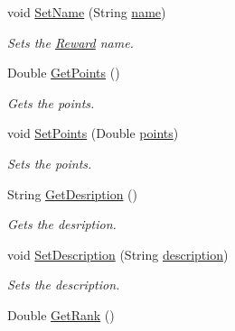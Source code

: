 \begin{DoxyCompactItemize}
void \hyperlink{classcom_1_1shephertz_1_1app42_1_1paas_1_1sdk_1_1csharp_1_1reward_1_1_reward_afd1f0f05bcd35103daa0ec9a3c651f12}{Set\+Name} (String \hyperlink{classcom_1_1shephertz_1_1app42_1_1paas_1_1sdk_1_1csharp_1_1reward_1_1_reward_a0e092b67d4fd4e7c458733cc1b1e38d1}{name})
\begin{DoxyCompactList}\small\item\em Sets the \hyperlink{classcom_1_1shephertz_1_1app42_1_1paas_1_1sdk_1_1csharp_1_1reward_1_1_reward}{Reward} name. \end{DoxyCompactList}\item 
Double \hyperlink{classcom_1_1shephertz_1_1app42_1_1paas_1_1sdk_1_1csharp_1_1reward_1_1_reward_afd3616cff1e4b019a366da552c483e55}{Get\+Points} ()
\begin{DoxyCompactList}\small\item\em Gets the points. \end{DoxyCompactList}\item 
void \hyperlink{classcom_1_1shephertz_1_1app42_1_1paas_1_1sdk_1_1csharp_1_1reward_1_1_reward_aba279b2d02474a5114eff2f2819dd30e}{Set\+Points} (Double \hyperlink{classcom_1_1shephertz_1_1app42_1_1paas_1_1sdk_1_1csharp_1_1reward_1_1_reward_ac5dc67f0962a577b371e98f76b3ea34b}{points})
\begin{DoxyCompactList}\small\item\em Sets the points. \end{DoxyCompactList}\item 
String \hyperlink{classcom_1_1shephertz_1_1app42_1_1paas_1_1sdk_1_1csharp_1_1reward_1_1_reward_a249b1666c0b96d8fe1ccb50d5cd7fdfd}{Get\+Desription} ()
\begin{DoxyCompactList}\small\item\em Gets the desription. \end{DoxyCompactList}\item 
void \hyperlink{classcom_1_1shephertz_1_1app42_1_1paas_1_1sdk_1_1csharp_1_1reward_1_1_reward_ae1ac38c9ea2b97abf56e840a6a68c61e}{Set\+Description} (String \hyperlink{classcom_1_1shephertz_1_1app42_1_1paas_1_1sdk_1_1csharp_1_1reward_1_1_reward_af47d9b6832d16cea33fbb19207ad0c5a}{description})
\begin{DoxyCompactList}\small\item\em Sets the description. \end{DoxyCompactList}\item 
Double \hyperlink{classcom_1_1shephertz_1_1app42_1_1paas_1_1sdk_1_1csharp_1_1reward_1_1_reward_a4914f9bd29aee1320b17bf0c31267a2e}{Get\+Rank} ()

\end{DoxyCompactItemize}
